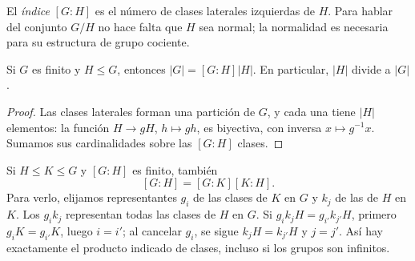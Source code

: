 El \emph{índice} $[G:H]$ es el número de clases laterales izquierdas de $H$. Para hablar del conjunto $G/H$ no hace falta que $H$ sea normal; la normalidad es necesaria para su estructura de grupo cociente.

\begin{prop}[Lagrange]\label{prop:C5-lagrange}
Si $G$ es finito y $H\le G$, entonces $|G|=[G:H]|H|$. En particular, $|H|$ divide a $|G|$.
\end{prop}
\begin{proof}
Las clases laterales forman una partición de $G$, y cada una tiene $|H|$ elementos: la función $H\to gH$, $h\mapsto gh$, es biyectiva, con inversa $x\mapsto g^{-1}x$. Sumamos sus cardinalidades sobre las $[G:H]$ clases.
\end{proof}
Si $H\le K\le G$ y $[G:H]$ es finito, también
\begin{equation}\label{eq:C5-indices}
[G:H]=[G:K][K:H].
\end{equation}
Para verlo, elijamos representantes $g_i$ de las clases de $K$ en $G$ y $k_j$ de las de $H$ en $K$. Los $g_ik_j$ representan todas las clases de $H$ en $G$. Si $g_ik_jH=g_{i'}k_{j'}H$, primero $g_iK=g_{i'}K$, luego $i=i'$; al cancelar $g_i$, se sigue $k_jH=k_{j'}H$ y $j=j'$. Así hay exactamente el producto indicado de clases, incluso si los grupos son infinitos.

\clearpage

